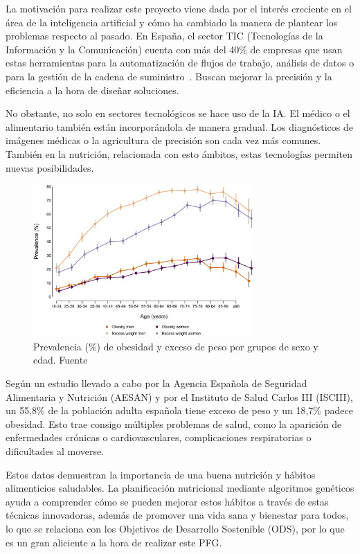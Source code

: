 La motivación para realizar este proyecto viene dada por el interés creciente en el área de la inteligencia artificial y cómo ha cambiado la manera de plantear los problemas respecto al pasado. En España, el sector TIC (Tecnologías de la Información y la Comunicación) cuenta con más del 40\% de empresas que usan estas herramientas para la automatización de flujos de trabajo, análisis de datos o para la gestión de la cadena de suministro~\cite{ontsi2023}. Buscan mejorar la precisión y la eficiencia a la hora de diseñar soluciones.

No obstante, no solo en sectores tecnológicos se hace uso de la IA. El médico o el alimentario también están incorporándola de manera gradual. Los diagnósticos de imágenes médicas o la agricultura de precisión son cada vez más comunes. También en la nutrición, relacionada con esto ámbitos, estas tecnologías permiten nuevas posibilidades.

\begin{figure}[H]
    \centering
    \includegraphics[width=0.75\textwidth]{figures/prevalencia-obesidad.png}
    \caption{Prevalencia (\%) de obesidad y exceso de peso por grupos de sexo y edad. Fuente \cite{ENE-COVID}}
    \label{fig:prevalencia-obesidad}
\end{figure}

Según un estudio llevado a cabo por la Agencia Española de Seguridad Alimentaria y Nutrición (AESAN) y por el Instituto de Salud Carlos III (ISCIII), un 55,8\% de la población adulta española tiene exceso de peso y un 18,7\% padece obesidad. Esto trae consigo múltiples problemas de salud, como la aparición de enfermedades crónicas o cardiovasculares, complicaciones respiratorias o dificultades al moverse.

Estos datos demuestran la importancia de una buena nutrición y hábitos alimenticios saludables. La planificación nutricional mediante algoritmos genéticos ayuda a comprender cómo se pueden mejorar estos hábitos a través de estas técnicas innovadoras, además de promover una vida sana y bienestar para todos, lo que se relaciona con los Objetivos de Desarrollo Sostenible (ODS), por lo que es un gran aliciente a la hora de realizar este PFG.



